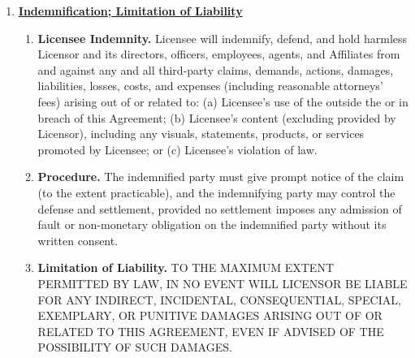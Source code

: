 \begin{enumerate}[leftmargin=*, label=\arabic*.]
\begin{enumerate}[leftmargin=*, label=\arabic{enumi}.\arabic*]
		\item \textbf{Licensor Rights.} Licensor represents that, to Licensor's knowledge,
		Licensor owns and/or controls sufficient rights in the \licensedIP to grant the licenses
		expressly granted in this Agreement and Exhibit B.

		\item \textbf{Licensee Compliance.} Licensee represents it will use the \licensedIP only
		within the scope of the \permittedUses and in compliance with applicable law.

		\item \textbf{Disclaimer.} EXCEPT AS EXPRESSLY PROVIDED IN THIS AGREEMENT, THE LICENSED
		IP IS PROVIDED ``AS IS,'' AND LICENSOR DISCLAIMS ALL WARRANTIES, WHETHER EXPRESS,
		IMPLIED, OR STATUTORY, INCLUDING IMPLIED WARRANTIES OF MERCHANTABILITY, FITNESS FOR A
		PARTICULAR PURPOSE, NON-INFRINGEMENT, AND TITLE.
	\end{enumerate}

	\item \textbf{\uline{Indemnification; Limitation of Liability}}

	\begin{enumerate}[leftmargin=*, label=\arabic{enumi}.\arabic*]
		\item \textbf{Licensee Indemnity.} Licensee will indemnify, defend, and hold harmless
		Licensor and its directors, officers, employees, agents, and Affiliates from and against
		any and all third-party claims, demands, actions, damages, liabilities, losses, costs,
		and expenses (including reasonable attorneys' fees) arising out of or related to: (a)
		Licensee's use of the \licensedIP outside the \permittedUses or in breach of this
		Agreement; (b) Licensee's \project content (excluding \licensedIP provided by Licensor),
		including any visuals, statements, products, or services promoted by Licensee; or (c)
		Licensee's violation of law.

		\item \textbf{Procedure.} The indemnified party must give prompt notice of the claim (to
		the extent practicable), and the indemnifying party may control the defense and
		settlement, provided no settlement imposes any admission of fault or non-monetary
		obligation on the indemnified party without its written consent.

		\item \textbf{Limitation of Liability.} TO THE MAXIMUM EXTENT PERMITTED BY LAW, IN NO
		EVENT WILL LICENSOR BE LIABLE FOR ANY INDIRECT, INCIDENTAL, CONSEQUENTIAL, SPECIAL,
		EXEMPLARY, OR PUNITIVE DAMAGES ARISING OUT OF OR RELATED TO THIS AGREEMENT, EVEN IF
		ADVISED OF THE POSSIBILITY OF SUCH DAMAGES.


\end{enumerate}
\end{enumerate}
